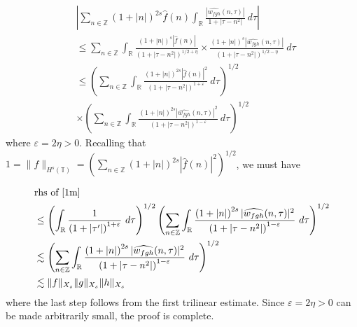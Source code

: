 \documentclass[handout]{beamer}
\numberwithin{equation}{section}
\newcommand{\rr}{\mathbb{R}}
\newcommand{\zz}{\mathbb{Z}}
\newcommand{\ci}{\mathbb{T}}
\newcommand{\ee}{\varepsilon}
\newcommand{\wh}{\widehat}
\begin{document}
\begin{frame}
%
\begin{equation}
	\label{1m}
	\begin{split}
		& | \sum_{n \in \zz} \left(1 + |n| \right)^{2s} \wh{f}(n)  
		\int_{\rr}\frac{| \wh{w_{fgh}}(n, \tau) |}{1 + | \tau - n^{2 } |} \ d \tau |
		\\
		& \le \sum_{n \in \zz} \int_{\rr} \frac{\left(1 + |n| \right)^s |\wh{f}(n)|}{\left( 1 + 
		| \tau - n^{2 } |
		\right)^{1/2 + \eta}} \times \frac{\left( 1 + | n | \right)^s |\wh{w_{fgh}}(n, \tau) |}{\left( 
		1 + | \tau - n^{2 } | \right)^{1/2 - \eta}} \ d \tau
		\\
		& \le \left( \sum_{n \in \zz} \int_{\rr} \frac{\left(1 + |n| \right)^{2s} | \wh{f}(n) 
		|^2}{\left( 1 + | \tau - n^{2 } | \right)^{1 + \ee}} \ d \tau  
		\right)^{1/2} 
		\\
		& \times \left ( \sum_{n \in \zz}\int_{\rr} \frac{\left(1 + |n| \right)^{2s} | \wh{w_{fgh}}(n, \tau) 
		|^2}{\left( 1 + | \tau - n^{2 } | \right)^{1 - \ee}}\ d \tau 
		\right)^{1/2}
	\end{split}
\end{equation}
%
where $\ee = 2 \eta > 0$. Recalling that
$1 = \|f\|_{H^s(\ci)} = \left( \sum_{n \in \zz} \left(1 + |n| \right)^{2s} | \wh{f}(n) |^2 
\right)^{1/2}$, we must have

\end{frame}
%
\begin{frame}


%
\begin{equation*}
	\begin{split}
		& \text{rhs of } \eqref{1m} 
		\\
		& \le \left ( \int_{\rr} \frac{1}{\left( 1 + | \tau' | \right)^{1 + \ee}} \ d 
		\tau \right)^{1/2}
		\left ( \sum_{n \in \zz}\int_{\rr} \frac{\left(1 + |n| \right)^{2s} | \wh{w_{fgh}}(n, \tau) 
		|^2}{\left( 1 + | \tau - n^{2 } | \right)^{1 - \ee}}\ d \tau 
		\right)^{1/2}
		\\
		& \lesssim
		\left ( \sum_{n \in \zz}\int_{\rr} \frac{\left(1 + |n| \right)^{2s} | \wh{w_{fgh}}(n, \tau) 
		|^2}{\left( 1 + | \tau - n^{2 } | \right)^{1 - \ee}}\ d \tau 
		\right)^{1/2}
		\\
		& \lesssim \|f\|_{X_s}\|g\|_{X_s}\|h\|_{X_s} 
	\end{split}
\end{equation*}
%
where the last step follows from the first trilinear estimate. Since  
$\ee = 2\eta>0$ can be made arbitrarily small, the proof is complete. 
\qquad \qedsymbol

\end{frame}
\end{document}

